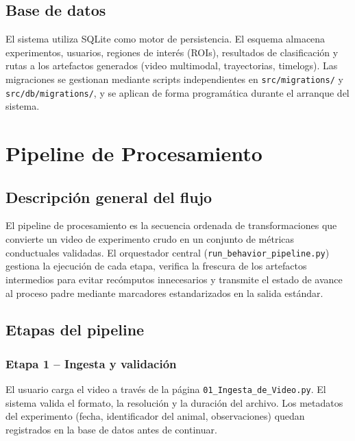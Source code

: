 \documentclass[12pt]{report}
\begin{document}
\section{Base de datos}

El sistema utiliza SQLite como motor de persistencia. El esquema almacena
experimentos, usuarios, regiones de interés (ROIs), resultados de clasificación
y rutas a los artefactos generados (video multimodal, trayectorias, timelogs).
Las migraciones se gestionan mediante scripts independientes en \texttt{src/migrations/}
y \texttt{src/db/migrations/}, y se aplican de forma programática durante el arranque
del sistema.

\chapter{Pipeline de Procesamiento}

\section{Descripción general del flujo}

El pipeline de procesamiento es la secuencia ordenada de transformaciones que
convierte un video de experimento crudo en un conjunto de métricas conductuales
validadas. El orquestador central (\texttt{run\_behavior\_pipeline.py}) gestiona
la ejecución de cada etapa, verifica la frescura de los artefactos intermedios
para evitar recómputos innecesarios y transmite el estado de avance al proceso
padre mediante marcadores estandarizados en la salida estándar.

\section{Etapas del pipeline}

\subsection{Etapa 1 -- Ingesta y validación}

El usuario carga el video a través de la página \texttt{01\_Ingesta\_de\_Video.py}.
El sistema valida el formato, la resolución y la duración del archivo. Los metadatos
del experimento (fecha, identificador del animal, observaciones) quedan registrados
en la base de datos antes de continuar.
\end{document}

